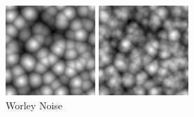 \begin{figure}[H]
    \centering
    \begin{minipage}[t]{0.32\textwidth}
        \centering
        \includegraphics[width=\linewidth]{images/pure_worley.png}
        \caption{Worley Noise}
        \label{fig:pure_worley}
    \end{minipage}
    \hfill
    \begin{minipage}[t]{0.32\textwidth}
        \centering
        \includegraphics[width=\linewidth]{images/fbm_worley.png}

\end{minipage}
\end{figure}

